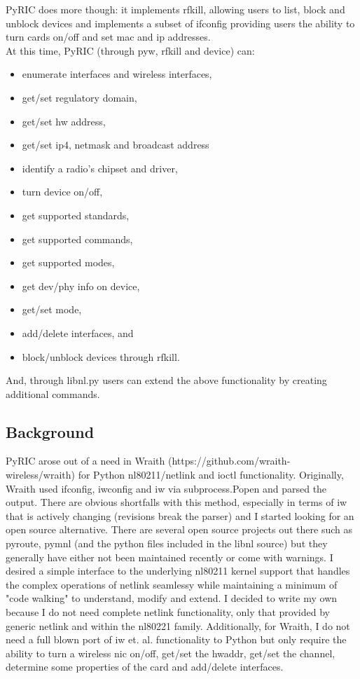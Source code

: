 \documentclass[11pt]{article}
\begin{document}
PyRIC does more though: it implements rfkill, allowing users to list, block and 
unblock devices and implements a subset of ifconfig providing users the ability 
to turn cards on/off and set mac and ip addresses. \\

At this time, PyRIC (through pyw, rfkill and device) can:
\begin{itemize}
\item enumerate interfaces and wireless interfaces,
\item get/set regulatory domain,
\item get/set hw address,
\item get/set ip4, netmask and broadcast address
\item identify a radio's chipset and driver,
\item turn device on/off,
\item get supported standards,
\item get supported commands,
\item get supported modes,
\item get dev/phy info on device,
\item get/set mode,
\item add/delete interfaces, and
\item block/unblock devices through rfkill.
\end{itemize}
And, through libnl.py users can extend the above functionality by creating 
additional commands.\\

\subsection{Background}
PyRIC arose out of a need in Wraith (https://github.com/wraith-wireless/wraith)
for Python nl80211/netlink and ioctl functionality. Originally, Wraith used
ifconfig, iwconfig and iw via subprocess.Popen and parsed the output. There
are obvious shortfalls with this method, especially in terms of iw that is
actively changing (revisions break the parser) and I started looking for an
open source alternative. There are several open source projects out there
such as pyroute, pymnl (and the python files included in the libnl source) but
they generally have either not been maintained recently or come with warnings.
I desired a simple interface to the underlying nl80211 kernel support that
handles the complex operations of netlink seamlessy while maintaining a minimum
of "code walking" to understand, modify and extend. I decided to write my own
because I do not need complete netlink functionality, only that provided by
generic netlink and within the nl80221 family. Additionally, for Wraith, I do
not need a full blown port of iw et. al. functionality to Python but only
require the ability to turn a wireless nic on/off, get/set the hwaddr, get/set
the channel, determine some properties of the card and add/delete interfaces.
\end{document}
